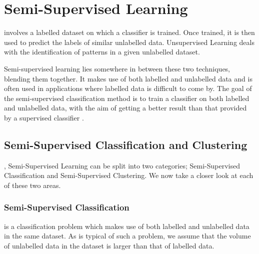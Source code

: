 
\newcommand{\R}{\mathbb{R}}

\chapter[Semi-Supervised Learning]{Semi-Supervised Learning}
\label{ch:semisuper}


 involves a labelled dataset on which a classifier is trained. Once trained, it is then used to predict the labels of similar unlabelled data. Unsupervised Learning deals with the identification of patterns in a given unlabelled dataset.

Semi-supervised learning lies somewhere in between these two techniques, blending them together. It makes use of both labelled and unlabelled data and is often used in applications where labelled data is difficult to come by. The goal of the semi-supervised classification method is to train a classifier on both labelled and unlabelled data, with the aim of getting a better result than that provided by a supervised classifier \citep{zhu2009introduction}.

\section{Semi-Supervised Classification and Clustering}\label{sec:class_clust}

, Semi-Supervised Learning can be split into two categories; Semi-Supervised Classification and Semi-Supervised Clustering. We now take a closer look at each of these two areas.

\subsection{Semi-Supervised Classification}\label{sec:class}

 is a classification problem which makes use of both labelled and unlabelled data in the same dataset. As is typical of such a problem, we assume that the volume of unlabelled data in the dataset is larger than that of labelled data.

